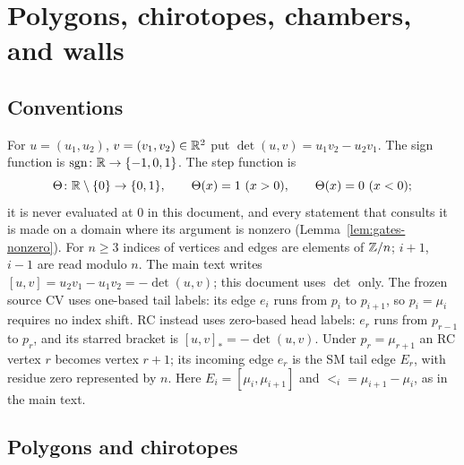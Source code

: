 \section{Polygons, chirotopes, chambers, and walls}\label{sec:polygons}

\subsection{Conventions}\label{sec:conventions}

For $u=(u_1,u_2)$, $v=(v_1,v_2)\in\mathbb R^2$ put $\det(u,v)=u_1v_2-u_2v_1$.
The sign function is $\operatorname{sgn}\colon\mathbb R\to\{-1,0,1\}$. The step function is
\[
\Theta\colon\mathbb R\setminus\{0\}\to\{0,1\},\qquad
\Theta(x)=1\ (x>0),\qquad \Theta(x)=0\ (x<0);
\]
it is never evaluated at $0$ in this document, and every statement that
consults it is made on a domain where its argument is nonzero
(Lemma~\ref{lem:gates-nonzero}). For $n\geq3$ indices of vertices and edges
are elements of $\mathbb Z/n$; $i+1$, $i-1$ are read modulo $n$. The main text
writes $[u,v]=u_2v_1-u_1v_2=-\det(u,v)$; this document uses $\det$ only.
The frozen source CV uses one-based tail labels: its edge $e_i$ runs
from $p_i$ to $p_{i+1}$, so $p_i=\mu_i$ requires no index shift.
RC instead uses zero-based head labels: $e_r$ runs from $p_{r-1}$
to $p_r$, and its starred bracket is $[u,v]_*=-\det(u,v)$.
Under $p_r=\mu_{r+1}$ an RC vertex $r$ becomes vertex $r+1$;
its incoming edge $e_r$ is the SM tail edge $E_r$, with residue zero
represented by $n$. Here $E_i=[\mu_i,\mu_{i+1}]$ and
$\lt_i=\mu_{i+1}-\mu_i$, as in the main text.

\subsection{Polygons and chirotopes}

